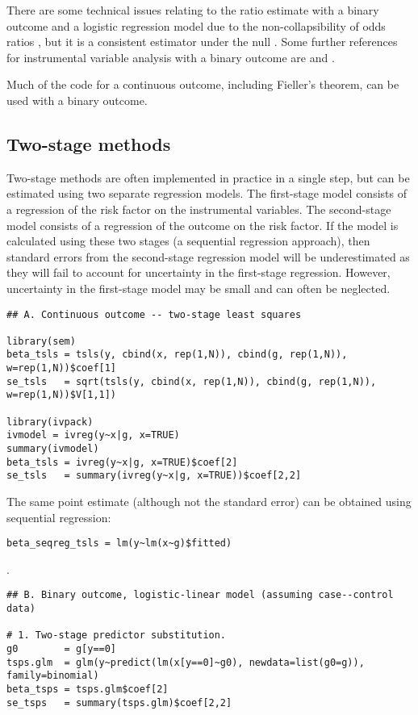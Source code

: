 \documentclass[a4paper,12pt]{article} %
\begin{document}
There are some technical issues relating to the ratio estimate with a binary outcome and a logistic regression model due to the non-collapsibility of odds ratios \citep{greenland1999}, but it is a consistent estimator under the null \citep{vansteelandt2010}. Some further references for instrumental variable analysis with a binary outcome are \cite{palmer2011b} and \cite{clarke2012}.

Much of the code for a continuous outcome, including Fieller's theorem, can be used with a binary outcome.

\clearpage

\subsection{Two-stage methods}
Two-stage methods are often implemented in practice in a single step, but can be estimated using two separate regression models. The first-stage model consists of a regression of the risk factor on the instrumental variables. The second-stage model consists of a regression of the outcome on the risk factor. If the model is calculated using these two stages (a sequential regression approach), then standard errors from the second-stage regression model will be underestimated as they will fail to account for uncertainty in the first-stage regression. However, uncertainty in the first-stage model may be small and can often be neglected.

\begin{lstlisting}
## A. Continuous outcome -- two-stage least squares

library(sem)
beta_tsls = tsls(y, cbind(x, rep(1,N)), cbind(g, rep(1,N)), w=rep(1,N))$coef[1]
se_tsls   = sqrt(tsls(y, cbind(x, rep(1,N)), cbind(g, rep(1,N)), w=rep(1,N))$V[1,1])

library(ivpack)
ivmodel = ivreg(y~x|g, x=TRUE)
summary(ivmodel)
beta_tsls = ivreg(y~x|g, x=TRUE)$coef[2]
se_tsls   = summary(ivreg(y~x|g, x=TRUE))$coef[2,2]
\end{lstlisting}

The same point estimate (although not the standard error) can be obtained using sequential regression:

\begin{lstlisting}
beta_seqreg_tsls = lm(y~lm(x~g)$fitted)
\end{lstlisting}.

\begin{lstlisting}
## B. Binary outcome, logistic-linear model (assuming case--control data)

# 1. Two-stage predictor substitution.
g0        = g[y==0]
tsps.glm  = glm(y~predict(lm(x[y==0]~g0), newdata=list(g0=g)), family=binomial)
beta_tsps = tsps.glm$coef[2]
se_tsps   = summary(tsps.glm)$coef[2,2]
\end{lstlisting}
\end{document}
